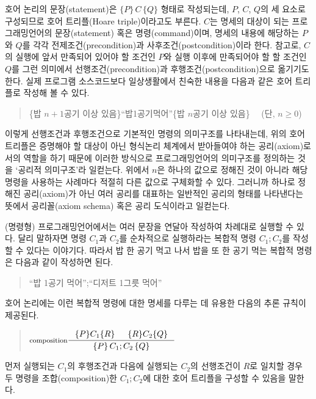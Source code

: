 호어 논리의 문장(statement)은 $\{P\}\,C\,\{Q\}$ 형태로 작성되는데,
$P$, $C$, $Q$의 세 요소로 구성되므로 호어 트리플(Hoare triple)이라고도
부른다. $C$는 명세의 대상이 되는 프로그래밍언어의 문장(statement) 혹은
명령(command)이며, 명세의 내용에 해당하는 ${P}$와 ${Q}$를 각각
전제조건(precondition)과 사후조건(postcondition)이라 한다.
참고로, $C$의 실행에 앞서 만족되어 있어야 할 조건인 $P$와
실행 이후에 만족되어야 할 할 조건인 $Q$를 그런 의미에서
선행조건(precondition)과 후행조건(postcondition)으로 옮기기도 한다.
실제 프로그램 소스코드보다 일상생활에서 친숙한 내용을 다음과 같은
호어 트리플로 작성해 볼 수 있다.
\begin{quote}\small
\{밥 $n+1$공기 이상 있음\}\;``밥\;1공기\;먹어''\;\{밥 $n$공기 이상 있음\}
~~(단, $n\ge 0$)
\end{quote}
이렇게 선행조건과 후행조건으로 기본적인 명령의 의미구조를 나타내는데,
위의 호어 트리플은 증명해야 할 대상이 아닌 형식논리 체계에서
받아들여야 하는 공리(axiom)로서의 역할을 하기 때문에 이러한 방식으로
프로그래밍언어의 의미구조를 정의하는 것을 `공리적 의미구조'라
일컫는다. 위에서 $n$은 하나의 값으로 정해진 것이 아니라 해당 명령을
사용하는 사례마다 적절히 다른 값으로 구체화할 수 있다. 그러니까 하나로
정해진 공리(axiom)가 아닌 여러 공리를 대표하는 일반적인 공리의 형태를
나타낸다는 뜻에서 공리꼴(axiom schema) 혹은 공리 도식이라고 일컫는다.

(명령형) 프로그래밍언어에서는 여러 문장을 연달아 작성하여 차례대로
실행할 수 있다. 달리 말하자면 명령 $C_1$과 $C_2$를 순차적으로 실행하라는
복합적 명령 $C_1;C_2$를 작성할 수 있다는 이야기다. 따라서 밥 한 공기
먹고 나서 밥을 또 한 공기 먹는 복합적 명령은 다음과 같이 작성하면 된다.
\begin{quote}\small
``밥 1공기 먹어'';``디저트 1그릇 먹어''
\end{quote}
호어 논리에는 이런 복합적 명령에 대한 명세를 다루는 데 유용한
다음의 추론 규칙이 제공된다.
\begin{quote}
\( \inference[composition]{ \{P\}C_1\{R\} & \{R\}C_2\{Q\} }{
                            \{P\}\,C_1;C_2\,\{Q\} } \)
\end{quote}
먼저 실행되는 $C_1$의 후행조건과 다음에 실행되는 $C_2$의 선행조건이
$R$로 일치할 경우 두 명령을 조합(composition)한 $C_1;C_2$에 대한
호어 트리플을 구성할 수 있음을 말한다.

